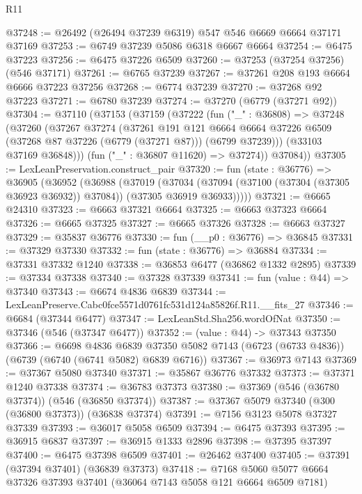 \begin{lexlean}{R11}
\begin{coremodule}
@37248 := @26492 (@26494 @37239 @6319) @547 @546 @6669 @6664 @37171 @37169
@37253 := @6749 @37239 @5086 @6318 @6667 @6664
@37254 := @6475 @37223
@37256 := @6475 @37226 @6509
@37260 := @37253 (@37254 @37256) (@546 @37171)
@37261 := @6765 @37239
@37267 := @37261 @208 @193 @6664 @6666 @37223 @37256
@37268 := @6774 @37239
@37270 := @37268 @92 @37223
@37271 := @6780 @37239
@37274 := @37270 (@6779 (@37271 @92))
@37304 := @37110
    (@37153
      (@37159
        (@37222
          (fun ("_" : @36808) =>
          @37248
            (@37260
              (@37267
                @37274
                (@37261
                  @191
                  @121
                  @6664
                  @6664
                  @37226
                  @6509
                  (@37268 @87 @37226 (@6779 (@37271 @87)))
                  (@6799 @37239)))
              (@33103 @37169 @36848)))
          (fun ("_" : @36807 @11620) => @37274))
        @37084))
@37305 := LexLeanPreservation.construct_pair
@37320 := fun (state : @36776) =>
  @36905
    (@36952
      (@36988
        (@37019
          (@37034
            (@37094 (@37100 (@37304 (@37305 @36923 @36932)) @37084))
            (@37305 @36919 @36933)))))
@37321 := @6665 @24310
@37323 := @6663 @37321 @6664
@37325 := @6663 @37323 @6664
@37326 := @6665 @37325
@37327 := @6665 @37326
@37328 := @6663 @37327
@37329 := @35837 @36776
@37330 := fun (__p0 : @36776) => @36845
@37331 := @37329 @37330
@37332 := fun (state : @36776) => @36884
@37334 := @37331 @37332 @1240
@37338 := @36853 @6477 (@36862 @1332 @2895)
@37339 := @37334 @37338
@37340 := @37328 @37339
@37341 := fun (value : @44) => @37340
@37343 := @6674 @4836 @6839
@37344 := LexLeanPreserve.Cabc0fce5571d0761fc531d124a85826f.R11.__fits_27
@37346 := @6684 (@37344 @6477)
@37347 := LexLeanStd.Sha256.wordOfNat
@37350 := @37346 (@546 (@37347 @6477))
@37352 := (value : @44) -> @37343 @37350
@37366 := @6698
    @4836
    @6839
    @37350
    @5082
    @7143
    (@6723 (@6733 @4836))
    (@6739 (@6740 (@6741 @5082) @6839 @6716))
@37367 := @36973 @7143
@37369 := @37367 @5080 @37340
@37371 := @35867 @36776 @37332
@37373 := @37371 @1240 @37338
@37374 := @36783 @37373
@37380 := @37369 (@546 (@36780 @37374)) (@546 (@36850 @37374))
@37387 := @37367 @5079 @37340 (@300 (@36800 @37373)) (@36838 @37374)
@37391 := @7156 @3123 @5078 @37327 @37339
@37393 := @36017 @5058 @6509
@37394 := @6475 @37393
@37395 := @36915 @6837
@37397 := @36915 @1333 @2896
@37398 := @37395 @37397
@37400 := @6475 @37398 @6509
@37401 := @26462 @37400
@37405 := @37391 (@37394 @37401) (@36839 @37373)
@37418 := @7168 @5060 @5077 @6664 @37326 @37393 @37401 (@36064 @7143 @5058 @121 @6664 @6509 @7181)

\end{coremodule}
\end{lexlean}
